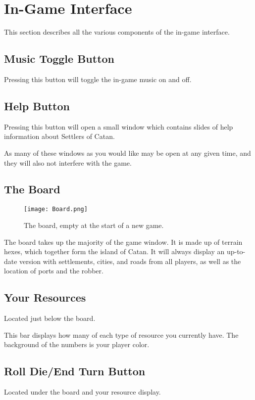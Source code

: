 \documentclass[12pt,letterpaper,titlepage]{article}
\begin{document}
\section{In-Game Interface}
This section describes all the various components of the in-game interface.
	\subsection{Music Toggle Button}
	Pressing this button will toggle the in-game music on and off.
	
	\subsection{Help Button}
	Pressing this button will open a small window which contains slides of help information about Settlers of Catan.
	
	As many of these windows as you would like may be open at any given time, and they will also not interfere with the game.
	
	\subsection{The Board}
	\begin{wrapfigure}{r}{.5\textwidth}
		\vspace{-70pt}
		\begin{center}
			\texttt{[image: Board.png]}
		\end{center}
		\vspace{-10pt}
		\caption{The board, empty at the start of a new game.}
		\vspace{-70pt}
	\end{wrapfigure}
	The board takes up the majority of the game window. It is made up of terrain hexes, which together form the island of Catan. It will always display an up-to-date version with settlements, cities, and roads from all players, as well as the location of ports and the robber.
	
	\subsection{Your Resources}
	Located just below the board.
	
	This bar displays how many of each type of resource you currently have. The background of the numbers is your player color.
	
	\subsection{Roll Die/End Turn Button}
	Located under the board and your resource display.
	
\end{document}

